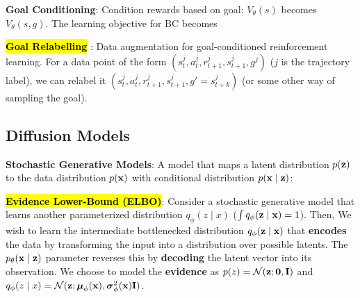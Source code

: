 \documentclass{article}
\begin{document}
  \textbf{Goal Conditioning}: Condition rewards based on goal: $V_\theta(s)$ becomes $V_\theta(s,g)$. The learning objective for BC becomes

  \hl{\textbf{Goal Relabelling}} \cite{andrychowicz2017hindsight}: Data augmentation for goal-conditioned reinforcement learning. For a data point of the form $(s_t^j,a_t^j,r_{t+1}^j,s_{t+1}^j,g^j)$ ($j$ is the trajectory label), we can relabel it $(s_t^j,a_t^j,r_{t+1}^j,s_{t+1}^j,g'=s^j_{t+k})$ (or some other way of sampling the goal).


\subsection{Diffusion Models}

  \textbf{Stochastic Generative Models}: A model that maps a latent distribution $p(\mathbf{z})$ to the data distribution $p(\mathbf{x})$ with conditional distribution $p(\mathbf{x}\mid \mathbf{z})$: 

  \hl{\textbf{Evidence Lower-Bound (ELBO)}}: Consider a stochastic generative model that learns another parameterized distribution $q_\phi(z\mid x)$ ($\int q_\phi(\mathbf{z}\mid\mathbf{x})=1$). Then,
  We wish to learn the intermediate bottlenecked distribution $q_\phi(\mathbf{z}\mid \mathbf{x})$ that \textbf{encodes} the data by transforming the input into a distribution over possible latents. The $p_\theta(\mathbf{x}\mid \mathbf{z})$ parameter reverses this by \textbf{decoding} the latent vector into its observation. We choose to model the \textbf{evidence} as $p(z)=\mathcal{N}(\mathbf{z};\mathbf{0},\mathbf{I})$ and $q_\phi(z\mid x)=\mathcal{N}(\mathbf{z};\boldsymbol{\mu}_\phi(\mathbf{x}),\boldsymbol{\sigma}^2_\phi(\mathbf{x})\mathbf{I})$.
\end{document}
